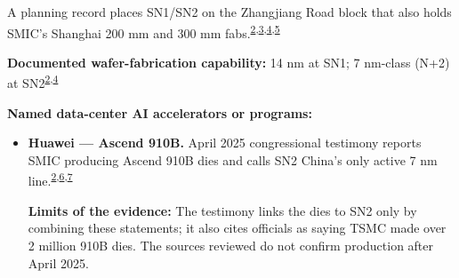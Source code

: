 \begin{minipage}[t][0.90\textheight][t]{\textwidth}
\begin{minipage}[t]{\textwidth}
\begin{minipage}[t]{0.32\textwidth}
\medskip
{\footnotesize A planning record places SN1/SN2 on the Zhangjiang Road block that also holds SMIC's Shanghai 200 mm and 300 mm fabs.\nobreak\textsuperscript{\href{\detokenize{https://www.congress.gov/119/meeting/house/118111/witnesses/HMTG-119-SY15-Wstate-AllenG-20250408.pdf}}{\textcolor{accent}{2}},\href{\detokenize{https://www.pudong.gov.cn/zwgk/14496.gkml_ywl_czxx_czyjs_kfqgwh_zjyqgwh_shszjkxcjsglbgsbb/2022/301/252143.html}}{\textcolor{accent}{3}},\href{\detokenize{https://www1.hkexnews.hk/listedco/listconews/sehk/2020/0608/2020060801093_c.pdf}}{\textcolor{accent}{4}},\href{\detokenize{https://web.archive.org/web/20260514171941/https://www.smics.com/en/site/factory_summary}}{\textcolor{accent}{5}}}\par}
\medskip
{\footnotesize\textbf{Documented wafer-fabrication capability:} 14 nm at SN1; 7 nm-class (N+2) at SN2\nobreak\textsuperscript{\href{\detokenize{https://www.congress.gov/119/meeting/house/118111/witnesses/HMTG-119-SY15-Wstate-AllenG-20250408.pdf}}{\textcolor{accent}{2}},\href{\detokenize{https://www1.hkexnews.hk/listedco/listconews/sehk/2020/0608/2020060801093_c.pdf}}{\textcolor{accent}{4}}}\par}
\end{minipage}
\end{minipage}
\par\vspace{0.65em}
\medskip
{\footnotesize\textbf{Named data-center AI accelerators or programs:}\par}
\begin{itemize}[leftmargin=1.25em,itemsep=0.35em,topsep=0.15em,parsep=0pt]
\item {\footnotesize\textbf{Huawei --- Ascend 910B.} April 2025 congressional testimony reports SMIC producing Ascend 910B dies and calls SN2 China's only active 7 nm line.\nobreak\textsuperscript{\href{\detokenize{https://www.congress.gov/119/meeting/house/118111/witnesses/HMTG-119-SY15-Wstate-AllenG-20250408.pdf}}{\textcolor{accent}{2}},\href{\detokenize{https://cset.georgetown.edu/publication/pushing-the-limits-huaweis-ai-chip-tests-u-s-export-controls/}}{\textcolor{accent}{6}},\href{\detokenize{https://www.malaymail.com/news/money/2024/10/27/tsmc-suspended-shipments-to-china-firm-after-chip-found-on-huawei-processor-sources-say/155003}}{\textcolor{accent}{7}}}\par {\scriptsize\color{black!62}\textbf{Limits of the evidence:} The testimony links the dies to SN2 only by combining these statements; it also cites officials as saying TSMC made over 2 million 910B dies. The sources reviewed do not confirm production after April 2025.\par}}

\end{itemize}
\end{minipage}
